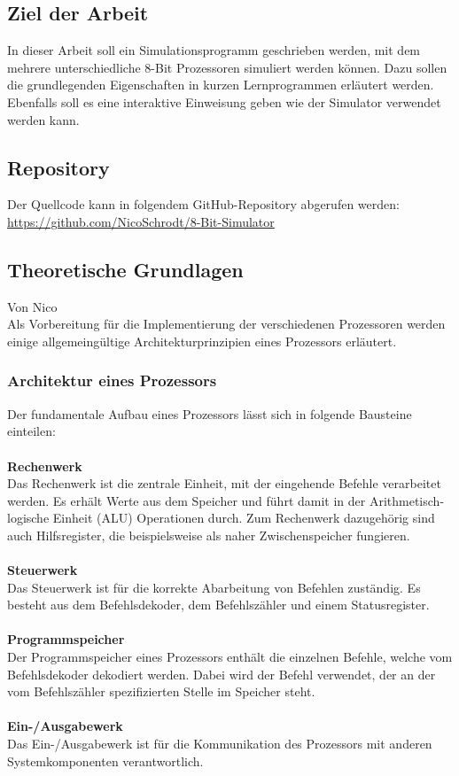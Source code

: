 \documentclass[12pt]{article}
\begin{document}
\subsection{Ziel der Arbeit}
In dieser Arbeit soll ein Simulationsprogramm geschrieben werden, mit dem mehrere unterschiedliche 8-Bit Prozessoren simuliert werden können. Dazu sollen die grundlegenden Eigenschaften in kurzen Lernprogrammen erläutert werden. Ebenfalls soll es eine interaktive Einweisung geben wie der Simulator verwendet werden kann.

\subsection{Repository}
Der Quellcode kann in folgendem GitHub-Repository abgerufen werden:\\ \url{https://github.com/NicoSchrodt/8-Bit-Simulator}

\newpage

\subsection{Theoretische Grundlagen}
Von Nico\\

\noindent
Als Vorbereitung für die Implementierung der verschiedenen Prozessoren werden einige allgemeingültige Architekturprinzipien eines Prozessors erläutert. 

\subsubsection{Architektur eines Prozessors}
Der fundamentale Aufbau eines Prozessors lässt sich in folgende Bausteine einteilen:\\ \\
\textbf{Rechenwerk}\\
Das Rechenwerk ist die zentrale Einheit, mit der eingehende Befehle verarbeitet werden. Es erhält Werte aus dem Speicher und führt damit in der Arithmetisch-logische Einheit (ALU) Operationen durch. Zum Rechenwerk dazugehörig sind auch Hilfsregister, die beispielsweise als naher Zwischenspeicher fungieren.\\ \\
\textbf{Steuerwerk}\\
Das Steuerwerk ist für die korrekte Abarbeitung von Befehlen zuständig. Es besteht aus dem Befehlsdekoder, dem Befehlszähler und einem Statusregister.\\ \\
\textbf{Programmspeicher}\\
Der Programmspeicher eines Prozessors enthält die einzelnen Befehle, welche vom Befehlsdekoder dekodiert werden. Dabei wird der Befehl verwendet, der an der vom Befehlszähler spezifizierten Stelle im Speicher steht.\\ \\
\textbf{Ein-/Ausgabewerk}\\
Das Ein-/Ausgabewerk ist für die Kommunikation des Prozessors mit anderen Systemkomponenten verantwortlich.\\
\end{document}
